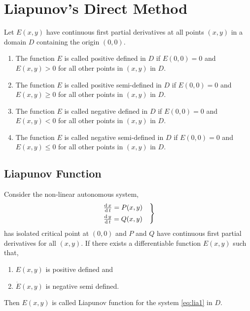 \documentclass[../main-sheet.tex]{subfiles}
\begin{document}
\chapter{Liapunov's Direct Method}
\begin{defn}
    Let \(E(x,y)\) have continuous first partial derivatives at all points \((x,y)\) in a domain \(D\) containing the origin \((0,0)\).
    \begin{enumerate}
        \item The function \(E\) is called positive defined in \(D\) if \(E(0,0)=0\) and \(E(x,y)>0\) for all other points in \((x,y)\) in \(D\).
        \item The function \(E\) is called positive semi-defined in \(D\) if \(E(0,0)=0\) and \(E(x,y)\geq 0\) for all other points in \((x,y)\) in \(D\).
        \item The function \(E\) is called negative defined in \(D\) if \(E(0,0)=0\) and \(E(x,y)< 0\) for all other points in \((x,y)\) in \(D\).
        \item The function \(E\) is called negative semi-defined in \(D\) if \(E(0,0)=0\) and \(E(x,y)\leq 0\) for all other points in \((x,y)\) in \(D\).
    \end{enumerate}
\end{defn}
\section{Liapunov Function}
Consider the non-linear autonomous system,
\begin{equation}
    \begin{rcases}
        \,\frac{\mathrm{d}\,x}{\mathrm{d}\,t}=P(x,y)\quad\\
        \,\frac{\mathrm{d}\,y}{\mathrm{d}\,t}=Q(x,y)
    \end{rcases}
    \label{eq:lia1}
\end{equation}
has isolated critical point at \((0,0)\) and \(P\) and \(Q\) have continuous first partial derivatives for all \((x,y)\). If there exists a differentiable function \(E(x,y)\) such that,
\begin{enumerate}[label=(\roman*)]
    \item \(E(x,y)\) is positive defined and
    \item \(\dot{E}(x,y)\) is negative semi defined.
\end{enumerate}
Then \(E(x,y)\) is called Liapunov function for the system \eqref{eq:lia1} in \(D\).
\end{document}

